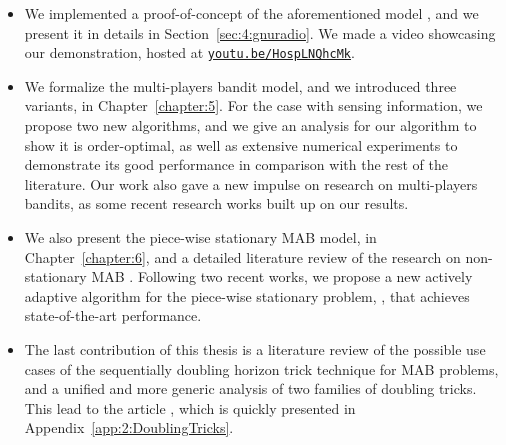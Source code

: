 \begin{itemize}
    \item
    We implemented a proof-of-concept of the aforementioned model \cite{Besson2018ICT}, and we present it in details in Section~\ref{sec:4:gnuradio}. We made a video showcasing our demonstration, hosted at \texttt{\href{https://youtu.be/HospLNQhcMk}{youtu.be/HospLNQhcMk}}.


    \item
    We formalize the multi-players bandit model, and we introduced three variants, in Chapter~\ref{chapter:5}.
    For the case with sensing information, we propose two new algorithms, and we give an analysis for our algorithm \MCTopM{} to show it is order-optimal,
    as well as extensive numerical experiments to demonstrate its good performance in comparison with the rest of the literature.
    Our work \cite{Besson2018ALT} also gave a new impulse on research on multi-players bandits, as some recent research works built up on our results.


    \item
    We also present the piece-wise stationary MAB model, in Chapter~\ref{chapter:6}, and a detailed literature review of the research on non-stationary MAB \cite{Besson2019GLRT,Besson2019Gretsi}.
    Following two recent works, we propose a new actively adaptive algorithm for the piece-wise stationary problem, \GLRklUCB, that achieves state-of-the-art performance.

    \item
    The last contribution of this thesis is a literature review of the possible use cases of the sequentially doubling horizon trick technique for MAB problems,
    and a unified and more generic analysis of two families of doubling tricks.
    This lead to the article \cite{Besson2018DoublingTricks}, which is quickly presented in Appendix~\ref{app:2:DoublingTricks}.
\end{itemize}


